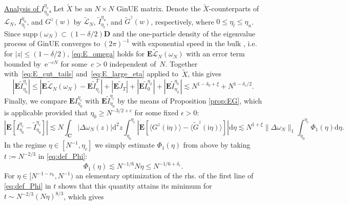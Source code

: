 \documentclass[10pt]{amsart}
\numberwithin{equation}{section}
\newcommand{\dif}{\mathrm{d}}
\newcommand{\E}{\mathbf{E}}
\newcommand{\C}{\mathbf{C}}
\newcommand{\Lin}{\mathcal{L}}
\newcommand{\ii}{\mathrm{i}}
\newcommand{\ee}{\mathrm{e}}
\begin{document}
\medskip

\noindent\underline{Analysis of $I_{\eta_0}^{\eta_c}$.} Let $\widetilde{X}$ be an $N\times N$ GinUE matrix. Denote the $\widetilde{X}$-counterparts of $\Lin_N$, $I_{\eta_l}^{\eta_u}$, and $G^z(w)$ by $\widetilde{\Lin}_N$, $\widetilde{I}_{\eta_l}^{\eta_u}$, and $\widetilde{G}^z(w)$, respectively, where $0\le \eta_l\le\eta_u$. Since $\mathrm{supp}(\omega_N)\subset (1-\delta/2)\mathbf{D}$ and the one-particle density of the eigenvalue process of GinUE converges to $(2\pi)^{-1}$ with exponential speed in the bulk \cite[Eq.(1.44)]{Ginibre65}, i.e. for  $|z|\le (1-\delta/2)$, \eqref{eq:E_omega} holds for $\E \widetilde{\Lin}_N(\omega_N)$ with an error term bounded by~$\ee^{-cN}$ for some~$c>0$ independent of~$N$. Together with~\eqref{eq:E_cut_tails} and~\eqref{eq:E_large_eta} applied to~$\widetilde{X}$, this gives 
\begin{equation}
\left\vert\E \widetilde{I}_{\eta_0}^{\eta_c}\right\vert\le \left\vert \E\widetilde{\Lin}_N(\omega_N)-\E \widetilde{I}_{\eta_c}^T\right\vert + \left\vert\E \widetilde{J}_T\right\vert + \left\vert\E \widetilde{I}_{0}^{\eta_L}\right\vert+\left\vert\E \widetilde{I}_{\eta_L}^{\eta_0}\right\vert \lesssim N^{1-\delta_0+\xi} + N^{1-\delta_c/2}.
\label{eq:I_Gin_bound}
\end{equation}
Finally, we compare $\E I_{\eta_0}^{\eta_c}$ with $\E \widetilde{I}_{\eta_0}^{\eta_c}$ by the means of Proposition \ref{prop:EG}, which is applicable provided that $\eta_0\ge N^{-3/2+\epsilon}$ for some fixed $\epsilon>0$:
\begin{equation}
\left\vert\E \left[ I_{\eta_0}^{\eta_c}-\widetilde{I}_{\eta_0}^{\eta_c}\right]\right\vert \!\lesssim\! N\!\!\int_\C |\Delta \omega_N(z)|\dif^2 z\! \int_{\eta_0}^{\eta_c} \left\vert \E \left[\langle G^z(\ii\eta)\rangle-\langle \widetilde{G}^z(\ii\eta)\rangle\right]\right\vert\dif \eta\lesssim N^{1+\xi}\|\Delta \omega_N\|_1\int_{\eta_0}^{\eta_c}\Phi_1(\eta)\dif\eta.
\label{eq:I_Gin_comparison}
\end{equation}
In the regime $\eta\in [N^{-1}, \eta_c]$ we simply estimate $\Phi_1(\eta)$ from above by taking $t:=N^{-2/3}$ in \eqref{eq:def_Phi}:
\begin{equation}
\Phi_1(\eta)\lesssim N^{-1/6}N\eta \le N^{-1/6+\delta_c}.
\label{eq:Phi1_bound1}
\end{equation}
For $\eta\in [N^{-1-\nu_0},N^{-1})$ an elementary optimization of the rhs. of the first line of \eqref{eq:def_Phi} in $t$ shows that this quantity attains its minimum for $t\sim N^{-2/3}(N\eta)^{8/3}$, which gives
\end{document}
